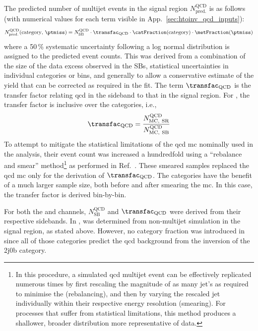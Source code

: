 The predicted number of multijet events in the signal region $N_{\mathrm{pred.}}^{\mathrm{QCD}}$ is as follows (with numerical values for each term visible in App.~\ref{sec:htoinv_qcd_inputs}):
\begin{equation}
    N_{\mathrm{pred.}}^{\mathrm{QCD}}(\text{category}, \, \ptmiss) = N_{\mathrm{SB}}^{\mathrm{QCD}} \cdot \transfac_{\mathrm{QCD}} \cdot \catFraction(\text{category}) \cdot \metFraction(\ptmiss)
    \label{eq:qcd_prediction}
\end{equation}
where a 50\,\% systematic uncertainty following a log normal distribution is assigned to the predicted event counts. This was derived from a combination of the size of the data excess observed in the \glspl{SB}, statistical uncertainties in individual categories or \ptmiss bins, and generally to allow a conservative estimate of the yield that can be corrected as required in the fit. The term $\transfac_{\mathrm{QCD}}$ is the transfer factor relating \acrshort{qcd} in the sideband to that in the signal region. For \ttH, the transfer factor is inclusive over the categories, i.e.,
\begin{equation}
    \transfac_{\mathrm{QCD}} = \frac{ N_{\mathrm{MC, \ SR}}^{\mathrm{QCD}} } { N_{\mathrm{MC, \ SB}}^{\mathrm{QCD}} }
    \label{eq:transfer_factor_qcd}
\end{equation}
To attempt to mitigate the statistical limitations of the \acrshort{qcd} \acrshort{mc} nominally used in the analysis, their event count was increased a hundredfold using a ``rebalance and smear'' method\footnote{In this procedure, a simulated \acrshort{qcd} multijet event can be effectively replicated numerous times by first rescaling the magnitude of as many \gls{jet}'s \ptvec as required to minimise the \mht (rebalancing), and then by varying the rescaled \gls{jet} \pt individually within their respective energy resolution (smearing). For processes that suffer from statistical limitations, this method produces a shallower, broader \ptmiss distribution more representative of data.} as performed in Ref.~. These smeared samples replaced the \acrshort{qcd} \acrshort{mc} only for the derivation of $\transfac_{\mathrm{QCD}}$. The \VH categories have the benefit of a much larger sample size, both before and after smearing the \acrshort{mc}. In this case, the transfer factor is derived bin-by-bin.

For both the \ttH and \VH channels, $N_{\mathrm{SB}}^{\mathrm{QCD}}$ and $\transfac_{\mathrm{QCD}}$ were derived from their respective sidebands. In \ttH, \catFraction was determined from non-multijet simulation in the signal region, as stated above. However, no category fraction was introduced in \VH since all of those categories predict the \acrshort{qcd} background from the inversion of the 2j0b category.
